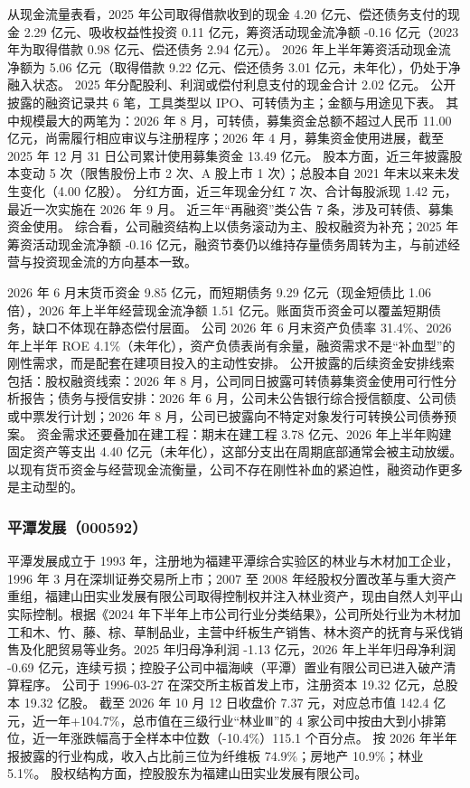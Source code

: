  从现金流量表看，2025 年公司取得借款收到的现金 4.20 亿元、偿还债务支付的现金 2.29 亿元、吸收权益性投资 0.11 亿元，筹资活动现金流净额 -0.16 亿元（2023 年为取得借款 0.98 亿元、偿还债务 2.94 亿元）。 2026 年上半年筹资活动现金流净额为 5.06 亿元（取得借款 9.22 亿元、偿还债务 3.01 亿元，未年化），仍处于净融入状态。 2025 年分配股利、利润或偿付利息支付的现金合计 2.02 亿元。 公开披露的融资记录共 6 笔，工具类型以 IPO、可转债为主；金额与用途见下表。 其中规模最大的两笔为：2026 年 8 月，可转债，募集资金总额不超过人民币 11.00 亿元，尚需履行相应审议与注册程序；2026 年 4 月，募集资金使用进展，截至 2025 年 12 月 31 日公司累计使用募集资金 13.49 亿元。 股本方面，近三年披露股本变动 5 次（限售股份上市 2 次、A 股上市 1 次）；总股本自 2021 年末以来未发生变化（4.00 亿股）。 分红方面，近三年现金分红 7 次、合计每股派现 1.42 元，最近一次实施在 2026 年 9 月。 近三年“再融资”类公告 7 条，涉及可转债、募集资金使用。 综合看，公司融资结构上以债务滚动为主、股权融资为补充；2025 年筹资活动现金流净额 -0.16 亿元，融资节奏仍以维持存量债务周转为主，与前述经营与投资现金流的方向基本一致。

 2026 年 6 月末货币资金 9.85 亿元，而短期债务 9.29 亿元（现金短债比 1.06 倍），2026 年上半年经营现金流净额 1.51 亿元。账面货币资金可以覆盖短期债务，缺口不体现在静态偿付层面。 公司 2026 年 6 月末资产负债率 31.4\%、2026 年上半年 ROE 4.1\%（未年化），资产负债表尚有余量，融资需求不是“补血型”的刚性需求，而是配套在建项目投入的主动性安排。 公开披露的后续资金安排线索包括：股权融资线索：2026 年 8 月，公司同日披露可转债募集资金使用可行性分析报告；债务与授信安排：2026 年 6 月，公司未公告银行综合授信额度、公司债或中票发行计划；2026 年 8 月，公司已披露向不特定对象发行可转换公司债券预案。 资金需求还要叠加在建工程：期末在建工程 3.78 亿元、2026 年上半年购建固定资产等支出 4.40 亿元（未年化），这部分支出在周期底部通常会被主动放缓。 以现有货币资金与经营现金流衡量，公司不存在刚性补血的紧迫性，融资动作更多是主动型的。




\subsubsection{平潭发展（000592）}
\label{co:000592}

 平潭发展成立于 1993 年，注册地为福建平潭综合实验区的林业与木材加工企业，1996 年 3 月在深圳证券交易所上市；2007 至 2008 年经股权分置改革与重大资产重组，福建山田实业发展有限公司取得控制权并注入林业资产，现由自然人刘平山实际控制。根据《2024 年下半年上市公司行业分类结果》，公司所处行业为木材加工和木、竹、藤、棕、草制品业，主营中纤板生产销售、林木资产的抚育与采伐销售及化肥贸易等业务。2025 年归母净利润 -1.13 亿元，2026 年上半年归母净利润 -0.69 亿元，连续亏损；控股子公司中福海峡（平潭）置业有限公司已进入破产清算程序。 公司于 1996-03-27 在深交所主板首发上市，注册资本 19.32 亿元，总股本 19.32 亿股。 截至 2026 年 10 月 12 日收盘价 7.37 元，对应总市值 142.4 亿元，近一年+104.7\%，总市值在三级行业“林业Ⅲ”的 4 家公司中按由大到小排第位，近一年涨跌幅高于全样本中位数（-10.4\%）115.1 个百分点。 按 2026 年半年报披露的行业构成，收入占比前三位为纤维板 74.9\%；房地产 10.9\%；林业 5.1\%。 股权结构方面，控股股东为福建山田实业发展有限公司。

